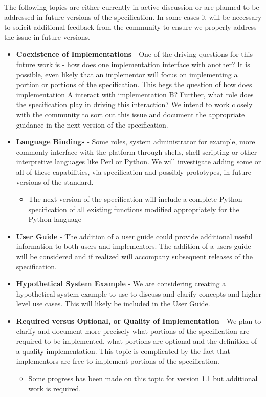 

The following topics are either currently in active discussion or are planned to be addressed in future versions of the specification.
In some cases it will be necessary to solicit additional feedback from the community to ensure we properly address the issue in future versions.

\begin{itemize}[noitemsep,nolistsep]

\item{\textbf{Coexistence of Implementations} - One of the driving questions for this future work is - how does one implementation interface with another? It is possible, even likely that an implementor will focus on implementing a portion or portions of the specification. This begs the question of how does implementation A interact with implementation B? Further, what role does the specification play in driving this interaction? We intend to work closely with the community to sort out this issue and document the appropriate guidance in the next version of the specification.
}
\item{\textbf{Language Bindings} - Some roles, system administrator for example, more commonly interface with the platform through shells, shell scripting or other interpretive languages like Perl or Python. We will investigate adding some or all of these capabilities, via specification and possibly prototypes, in future versions of the standard.
}
    \begin{itemize}
        \item{The next version of the specification will include a complete Python specification of all existing functions modified appropriately for the Python language}
    \end{itemize}

\item{\textbf{User Guide} - The addition of a user guide could provide additional useful information to both users and implementors. The addition of a users guide will be considered and if realized will accompany subsequent releases of the specification.
}
\item{\textbf{Hypothetical System Example} - We are considering creating a hypothetical system example to use to discuss and clarify concepts and higher level use cases. This will likely be included in the User Guide.
}
\item{\textbf{Required versus Optional, or Quality of Implementation} - We plan to clarify and document more precisely what portions of the specification are required to be implemented, what portions are optional and the definition of a quality implementation. This topic is complicated by the fact that implementors are free to implement portions of the specification. 
}
    \begin{itemize}
        \item{Some progress has been made on this topic for version 1.1 but additional work is required.}
    \end{itemize}


\end{itemize}
